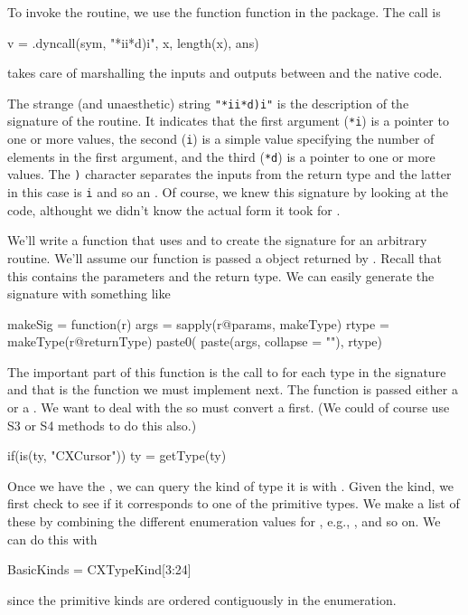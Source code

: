 To invoke the routine, we use the function  function
in the  package. 
The call is 
\begin{RCode}
v = .dyncall(sym, "*ii*d)i", x, length(x), ans)
\end{RCode}
 takes care of marshalling the inputs and outputs
between \R{} and the native code.

The strange (and unaesthetic) string \verb+"*ii*d)i"+ is the
description of the signature of the routine.  It indicates that the
first argument (\verb+*i+) is a pointer to one or more 
values, the second (\verb+i+) is a simple  value specifying
the number of elements in the first argument, and the third
(\verb+*d+) is a pointer to one or more  values.  The
\verb+)+ character separates the inputs from the return type and the
latter in this case is \verb+i+ and so an .  Of course, we knew this signature
by looking at the code, althought we didn't know the actual form it
took for .

We'll write a function that uses \libclang{} and  to
create the signature for an arbitrary routine.  We'll assume our
function is passed a  object returned by
.  Recall that this contains the parameters and the
return type.  We can easily generate the signature with something
like
\begin{RCode}
makeSig = 
function(r)
{
   args = sapply(r@params, makeType)
   rtype = makeType(r@returnType)
   paste0( paste(args, collapse = ""), rtype)
}
\end{RCode}
The important part of this function is the call to 
for each type in the signature and that is the function we must implement next.
The  function is passed  either a  or a .
We want to deal with the  so must convert a
 first. (We could of course use S3 or S4 methods to
do this also.)
\begin{RCode}
   if(is(ty, "CXCursor"))
     ty = getType(ty)
\end{RCode}
Once we have the , we can query the kind of type it is
with .
Given the kind, we first check to see if it corresponds to one of the
primitive \C{} types. We make a list of these by combining
the different enumeration values for , e.g.,
,  and so on.
We can do this with
\begin{RCode}
BasicKinds = CXTypeKind[3:24]
\end{RCode}
since the primitive kinds are ordered contiguously in the
enumeration.

